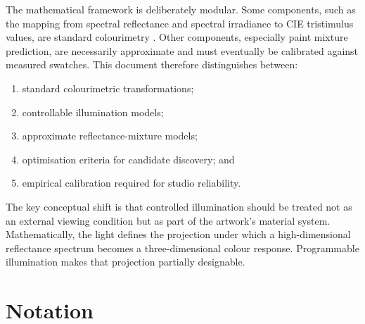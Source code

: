 \documentclass[11pt,a4paper]{article}
\begin{document}
The mathematical framework is deliberately modular. Some components, such as the mapping from spectral reflectance and spectral irradiance to CIE tristimulus values, are standard colourimetry \citep{CIE0152018,WyszeckiStiles2000,Berns2019}. Other components, especially paint mixture prediction, are necessarily approximate and must eventually be calibrated against measured swatches. This document therefore distinguishes between:
\begin{enumerate}[label=(\roman*)]
  \item standard colourimetric transformations;
  \item controllable illumination models;
  \item approximate reflectance-mixture models;
  \item optimisation criteria for candidate discovery; and
  \item empirical calibration required for studio reliability.
\end{enumerate}

The key conceptual shift is that controlled illumination should be treated not as an external viewing condition but as part of the artwork's material system. Mathematically, the light defines the projection under which a high-dimensional reflectance spectrum becomes a three-dimensional colour response. Programmable illumination makes that projection partially designable.

\section{Notation}
\end{document}
